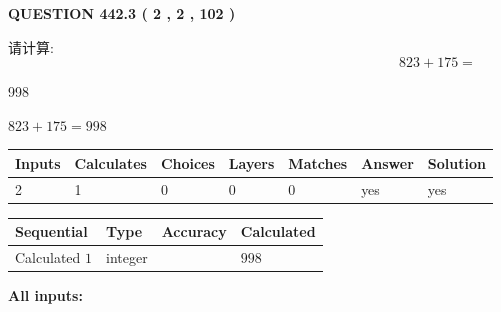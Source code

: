 \documentclass{ctexart}
\begin{document}
{\textbf{\Large{QUESTION
442.3 
 ( 2 , 2 , 102 )
}}}
  
  
 
请计算:
\begin{equation}
823 +  %
175 = \nonumber
\end{equation}
 
 
 
\noindent{}
 
 

998
 
 
\noindent{}
 
 

 
 
 
\noindent{}
 
 

$ %
823 +  %
175=   %
998$
 
 
\noindent{}
 
 

 
   
   
   
   
\noindent\begin{tabular}{|l|l|l|l|l|l|l|}
 \hline
Inputs & Calculates & Choices & Layers & Matches & Answer & Solution \\ \hline
 2  & 
 1  & 
 0
  & 
 0  & 
 0  & 
  yes & 
  yes 
  \\ \hline
 \end{tabular}
   
   
   
   
\noindent{}
   
   
  
  
\noindent\begin{tabular}{|l|l|l|l|}
\hline
 Sequential & Type & Accuracy & Calculated \\ 
\hline
 
 
  Calculated $  1 $ & integer &  & 
  $ 998 $ 
 \\  \hline  
 \end{tabular}
   
   
   
   
\noindent\vspace{0.1in}\hspace{-0.08in} {\textbf{\Large{All inputs: }}}
   
\end{document}
